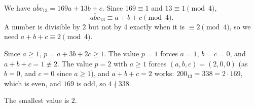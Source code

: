 We have $\overline{abc}_{13}=169a+13b+c$. Since $169\equiv1$ and $13\equiv1\pmod4$,
\[
\overline{abc}_{13}\equiv a+b+c\pmod4 .
\]
A number is divisible by $2$ but not by $4$ exactly when it is $\equiv2\pmod4$, so we need $a+b+c\equiv2\pmod4$.

Since $a\ge1$, $p=a+3b+2c\ge1$. The value $p=1$ forces $a=1$, $b=c=0$, and $a+b+c=1\not\equiv2$. The value $p=2$ with $a\ge1$ forces $(a,b,c)=(2,0,0)$ (as $b=0$, and $c=0$ since $a\ge1$), and $a+b+c=2$ works: $200_{13}=338=2\cdot169$, which is even, and $169$ is odd, so $4\nmid338$.

The smallest value is $\boxed{2}$.
